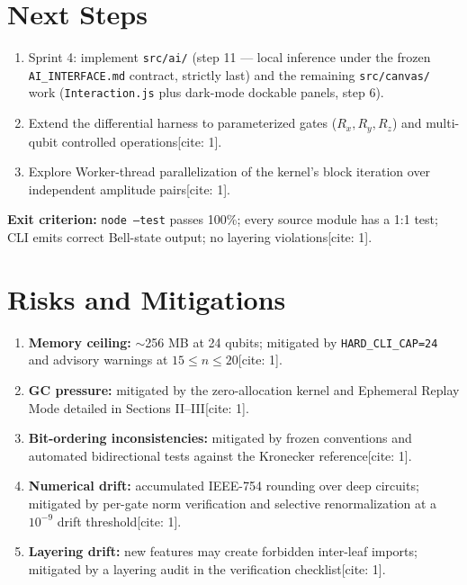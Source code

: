\documentclass[conference]{IEEEtran}
\begin{document}
\section{Next Steps}
\begin{enumerate}
    \item Sprint 4: implement \texttt{src/ai/} (step 11 --- local inference under the frozen \texttt{AI\_INTERFACE.md} contract, strictly last) and the remaining \texttt{src/canvas/} work (\texttt{Interaction.js} plus dark-mode dockable panels, step 6)\cite{1}.
    \item Extend the differential harness to parameterized gates ($R_x, R_y, R_z$) and multi-qubit controlled operations[cite: 1].
    \item Explore Worker-thread parallelization of the kernel's block iteration over independent amplitude pairs[cite: 1].
\end{enumerate}

\textbf{Exit criterion:} \texttt{node --test} passes 100\%; every source module has a 1:1 test; CLI emits correct Bell-state output; no layering violations[cite: 1].

\section{Risks and Mitigations}
\begin{enumerate}
    \item \textbf{Memory ceiling:} $\sim$256 MB at 24 qubits; mitigated by \texttt{HARD\_CLI\_CAP=24} and advisory warnings at $15\le n\le20$[cite: 1].
    \item \textbf{GC pressure:} mitigated by the zero-allocation kernel and Ephemeral Replay Mode detailed in Sections II--III[cite: 1].
    \item \textbf{Bit-ordering inconsistencies:} mitigated by frozen conventions and automated bidirectional tests against the Kronecker reference[cite: 1].
    \item \textbf{Numerical drift:} accumulated IEEE-754 rounding over deep circuits; mitigated by per-gate norm verification and selective renormalization at a $10^{-9}$ drift threshold[cite: 1].
    \item \textbf{Layering drift:} new features may create forbidden inter-leaf imports; mitigated by a layering audit in the verification checklist[cite: 1].
\end{enumerate}
\end{document}

